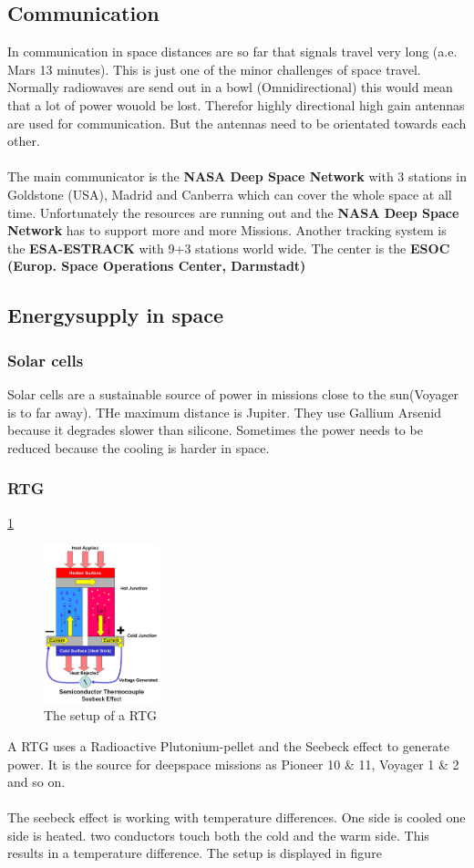 \subsection{Communication}
In communication in space distances are so far that signals travel very long (a.e. Mars 13 minutes). This is just one of the minor challenges of space travel. Normally radiowaves are send out in a bowl (Omnidirectional) this would mean that a lot of power wouold be lost. Therefor highly directional high gain antennas are used for communication. But the antennas need to be orientated towards each other.\\\\ The main communicator is the \textbf{NASA Deep Space Network} with 3 stations in Goldstone (USA), Madrid and Canberra which can cover the whole space at all time. Unfortunately the resources are running out and the \textbf{NASA Deep Space Network} has to support more and more Missions. Another tracking system is the \textbf{ESA-ESTRACK} with 9+3 stations world wide. The center is the \textbf{ESOC (Europ.
Space Operations Center,
Darmstadt)}

\subsection{Energysupply in space}
\subsubsection{Solar cells}
Solar cells are a sustainable source of power in missions close to the sun(Voyager is to far away). THe maximum distance is Jupiter. They use Gallium Arsenid because it degrades slower than silicone.  Sometimes the power needs to be reduced because the cooling is harder in space.
\subsubsection{\ac{RTG}}
\ref{fig:Foliensatz1:RTG} 
\begin{figure}
    \centering
    \includegraphics[width=0.3\textwidth]{images/Foliensatz2_RTG.png}
    \caption{The setup of a \ac{RTG}}
    \label{fig:Foliensatz1:RTG}
\end{figure}
A \ac{RTG} uses a Radioactive Plutonium-pellet and the Seebeck effect to generate power. It is the source for deepspace missions as Pioneer 10 \& 11, Voyager 1 \& 2 and so on.\\
\\
The seebeck effect is working with temperature differences. One side is cooled one side is heated. two conductors touch both the cold and the warm side. This results in a temperature difference. The setup is displayed in figure 
